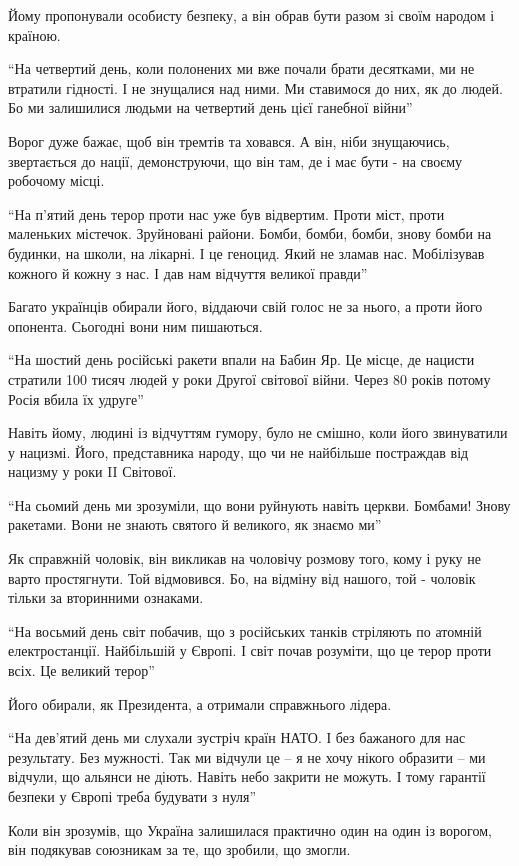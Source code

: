 Йому пропонували особисту безпеку, а він обрав бути разом зі своїм народом і
країною. 

\enquote{На четвертий день, коли полонених ми вже почали брати десятками, ми не
втратили гідності. І не знущалися над ними. Ми ставимося до них, як до людей.
Бо ми залишилися людьми на четвертий день цієї ганебної війни}

Ворог дуже бажає, щоб він тремтів та ховався. А він, ніби знущаючись,
звертається до нації, демонструючи, що він там, де і має бути - на своєму
робочому місці.

\enquote{На п'ятий день терор проти нас уже був відвертим. Проти міст, проти маленьких
містечок. Зруйновані райони. Бомби, бомби, бомби, знову бомби на будинки, на
школи, на лікарні. І це геноцид. Який не зламав нас. Мобілізував кожного й
кожну з нас. І дав нам відчуття великої правди}

Багато українців обирали його, віддаючи свій голос не за нього, а проти його
опонента. Сьогодні вони ним пишаються.

\enquote{На шостий день російські ракети впали на Бабин Яр. Це місце, де нацисти
стратили 100 тисяч людей у роки Другої світової війни. Через 80 років потому
Росія вбила їх удруге}

Навіть йому, людині із відчуттям гумору, було не смішно, коли його звинуватили
у нацизмі. Його, представника народу, що чи не найбільше постраждав від нацизму
у роки II Світової.

\enquote{На сьомий день ми зрозуміли, що вони руйнують навіть церкви. Бомбами! Знову
ракетами. Вони не знають святого й великого, як знаємо ми}

Як справжній чоловік, він викликав на чоловічу розмову того, кому і руку не
варто простягнути. Той відмовився. Бо, на відміну від нашого, той - чоловік
тільки за вторинними ознаками.

\enquote{На восьмий день світ побачив, що з російських танків стріляють по атомній
електростанції. Найбільшій у Європі. І світ почав розуміти, що це терор проти
всіх. Це великий терор}

Його обирали, як Президента, а отримали справжнього лідера.

\enquote{На дев'ятий день ми слухали зустріч країн НАТО. І без бажаного для нас
результату. Без мужності. Так ми відчули це – я не хочу нікого образити – ми
відчули, що альянси не діють. Навіть небо закрити не можуть. І тому гарантії
безпеки у Європі треба будувати з нуля}

Коли він зрозумів, що Україна залишилася практично один на один із ворогом, він
подякував союзникам за те, що зробили, що змогли.

